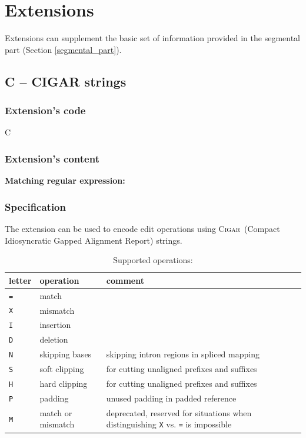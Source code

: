 \documentclass[10pt,a4paper]{article}
\newcommand{\re}[1]{\framebox{\mbox{\texttt{#1}}}}
\newcommand{\mre}[1]{\hspace{0.5cm}\textbf{Matching regular expression:} \re{#1}\smallskip}
\newcommand{\CIGAR}{\textsc{Cigar}}
\begin{document}

\section{Extensions}
\label{sec:extensions}
\appendix

Extensions can supplement the basic set of information provided in the segmental part (Section \ref{segmental_part}).

\subsection*{C -- CIGAR strings}

\subsubsection*{Extension's code}

\hspace{0.5cm} C

\subsubsection*{Extension's content}

\mre{\char94(?:([0-9]+[=XIDNSHPM]+)(?:,(?!\char36)|\char36))+\char36}


\subsubsection*{Specification}

The extension can be used to encode edit operations 
using \CIGAR\  (Compact Idiosyncratic Gapped Alignment Report) strings.

\medskip

\begin{table}[h]
\centering
\caption*{Supported operations:}
\begin{tabular}{|l|l|p{8cm}|}
	\hline
	letter & operation & comment 
	\\\hline
	\texttt{=} & match & \\
	\texttt{X} & mismatch & \\
	\texttt{I} & insertion & \\
	\texttt{D} & deletion &	\\
	\texttt{N} & skipping bases & skipping intron regions in spliced mapping \\
	\texttt{S} & soft clipping &
		for cutting unaligned prefixes and suffixes \\
	\texttt{H} & hard clipping &
		for cutting unaligned prefixes and suffixes \\
	\texttt{P} & padding & unused padding in padded reference\\
	\texttt{M} & match or mismatch	& deprecated, reserved for situations when distinguishing \texttt{X} vs. \texttt{=}
is impossible
	\\\hline
\end{tabular}
\end{table}
\end{document}
